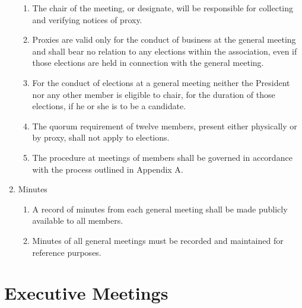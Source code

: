 \documentclass[12pt,a4paper]{article}
\begin{document}
\begin{enumerate}
\begin{enumerate}
\item The chair of the meeting, or designate, will be responsible for collecting and verifying notices of proxy.

\item Proxies are valid only for the conduct of business at the general meeting and shall bear no relation to any elections within the association, even if those elections are held in connection with the general meeting.

\item For the conduct of elections at a general meeting neither the President nor any other member is eligible to chair, for the duration of those elections, if he or she is to be a candidate.

\item The quorum requirement of twelve members, present either physically or by proxy, shall not apply to elections.

\item The procedure at meetings of members shall be governed in accordance with the process outlined in
Appendix A.
\end{enumerate}

\item Minutes

\begin{enumerate}
\item A record of minutes from each general meeting shall be made publicly available to all members.

\item Minutes of all general meetings must be recorded and maintained for reference purposes.
\end{enumerate}
\end{enumerate}

\section{Executive Meetings}
\end{document}
